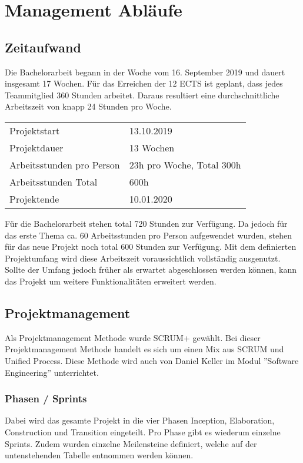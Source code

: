 \section{Management Abläufe}

\subsection{Zeitaufwand}
Die Bachelorarbeit begann in der Woche vom  16. September 2019 und dauert insgesamt 17 Wochen. Für das Erreichen der 12 ECTS ist geplant, dass jedes Teammitglied 360 Stunden arbeitet. Daraus resultiert eine durchschnittliche Arbeitszeit von knapp 24 Stunden pro Woche.

\begin{table}[h]
	\centering
	\begin{tabu} to 0.9\textwidth {l X}
	\toprule
	Projektstart & 13.10.2019 \\
	Projektdauer & 13 Wochen \\
	Arbeitsstunden pro Person & 23h pro Woche, Total 300h \\
	Arbeitsstunden Total & 600h \\
	Projektende & 10.01.2020 \\ 
	\bottomrule
	\end{tabu}
\end{table}


\noindent Für die Bachelorarbeit stehen total 720 Stunden zur Verfügung. Da jedoch für das erste Thema ca. 60 Arbeitsstunden pro Person aufgewendet wurden, stehen für das neue Projekt noch total 600 Stunden zur Verfügung. Mit dem definierten Projektumfang wird diese Arbeitszeit voraussichtlich vollständig ausgenutzt. Sollte der Umfang jedoch früher als erwartet abgeschlossen werden können, kann das Projekt um weitere Funktionalitäten erweitert werden.

\subsection{Projektmanagement}
Als Projektmanagement Methode wurde SCRUM+ gewählt. Bei dieser Projektmanagement Methode handelt es sich um einen Mix aus SCRUM und Unified Process. Diese Methode wird auch von Daniel Keller im Modul ''Software Engineering'' unterrichtet.

\newpage

\subsubsection{Phasen / Sprints}
Dabei wird das gesamte Projekt in die vier Phasen Inception, Elaboration, Construction und Transition eingeteilt. Pro Phase gibt es wiederum einzelne Sprints. Zudem wurden einzelne Meilensteine definiert, welche auf der untenstehenden Tabelle entnommen werden können.

